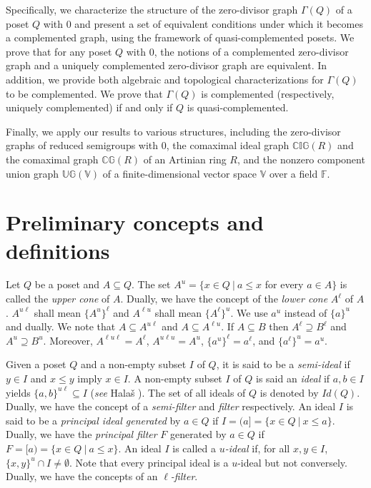 \documentclass[10pt,one side,emlines]{amsart}
\theoremstyle{definition}
\begin{document}
Specifically, we characterize the structure of the zero-divisor graph $\Gamma(Q)$ of a poset $Q$ with $0$ and present a set of equivalent conditions under which it becomes a complemented graph, using the framework of quasi-complemented posets. We prove that for any poset $Q$ with $0$, the notions of a complemented zero-divisor graph and a uniquely complemented zero-divisor graph are equivalent. In addition, we provide both algebraic and topological characterizations for $\Gamma(Q)$ to be complemented. We prove that $\Gamma(Q)$ is complemented (respectively, uniquely complemented) if and only if $Q$ is  quasi-complemented.

Finally, we apply our results to various structures, including the zero-divisor graphs of reduced semigroups with $0$, the comaximal ideal graph $\mathbb{CIG}(R)$ and the comaximal graph $\mathbb{CG}(R)$ of an Artinian ring $R$, and the nonzero component union graph $\mathbb{UG}(\mathbb{V})$ of a finite-dimensional vector space $\mathbb{V}$ over a field $\mathbb{F}$.


\section{Preliminary concepts and definitions}

Let $Q$ be a poset and $A \subseteq Q$. The set $A^u = \{ x \in Q~|~ a \leq x$ for every $a \in A\}$ is called the \textit{upper cone} of $A$. Dually, we have the concept of the \textit{lower cone} $A^{ \ell }$ of $A$. $A^{u \ell }$ shall mean $\{A^u\}^{ \ell }$ and $A^{ \ell u}$ shall mean $\{A^{ \ell }\}^u$. We use $a^u$ instead of $\{a\}^u$ and dually. We note that $A \subseteq A^{u \ell }$ and $A \subseteq A^{ \ell u}$. If $ A \subseteq B$ then $A^{ \ell } \supseteq B^{ \ell }$ and $A^u \supseteq B^u$. Moreover, $ A^{\ell u \ell } = A^{ \ell }$, $A^{ u \ell u} = A^u$, $\{a^u\}^{ \ell }=a^{ \ell }$, and $\{a^\ell\}^u=a^u$.

Given a poset $Q$ and a non-empty subset $I$ of $Q$, it is said to be a \textit{semi-ideal} if $y\in I$ and $x\leq y$ imply $x\in I$.
A non-empty subset $I$  of $Q$ is said an \textit{ideal} if $a, b\in I$ yields $\{a, b\}^{u\ell} \subseteq I$ (\textit{see} Hala\v s \cite{H}). The set of all ideals of $Q$ is denoted by $Id(Q)$. Dually, we have the concept of a \textit{semi-filter} and \textit{filter} respectively.
An ideal $I$ is said to be a \textit{principal ideal generated} by $a \in Q$ if $I = (a] = \{x \in Q ~|~ x \leq a\}$. Dually, we have the \textit{principal filter} $F$ generated by $a \in Q$ if $F =[a)=\{x \in Q ~|~ a \leq x\}$. An ideal $I$ is called a \textit{$u$-ideal} if, for all $x, y \in I$, $\{x, y\}^{u} \cap I \neq \emptyset$. Note that every principal ideal is a $u$-ideal but not conversely. Dually, we have the concepts of an \textit{$\ell$-filter}.
\end{document}
